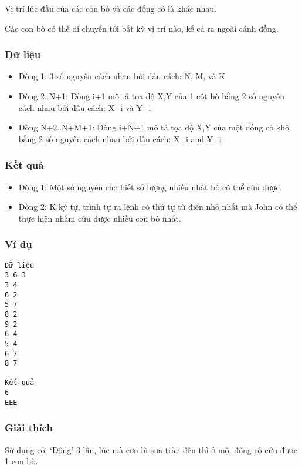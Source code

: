    Vị trí lúc đầu của các con bò và các đống cỏ là khác nhau.  

   Các con bò có thể di chuyển tới bất kỳ vị trí nào, kể cả ra ngoài cánh đồng.  

\subsubsection{   Dữ liệu  }
\begin{itemize}
	\item     Dòng 1: 3 số nguyên cách nhau bởi dấu cách: N, M, và K   
	\item     Dòng 2..N+1: Dòng i+1 mô tả tọa độ X,Y của 1 cột bò         bằng 2 số nguyên cách nhau bởi dấu cách: X\_i và Y\_i   
	\item     Dòng N+2..N+M+1: Dòng i+N+1 mô tả tọa độ X,Y của một         đống cỏ khô bằng 2 số nguyên cách nhau bởi dấu cách: X\_i and Y\_i   
\end{itemize}

\subsubsection{   Kết quả  }
\begin{itemize}
	\item     Dòng 1: Một số nguyên cho biết số lượng nhiều nhất bò có thể cứu được.   
	\item     Dòng 2: K ký tự, trình tự ra lệnh có thứ tự từ điển nhỏ nhất mà John có thể thực hiện nhằm cứu được nhiều con bò nhất.   
\end{itemize}

\subsubsection{   Ví dụ  }
\begin{verbatim}
Dữ liệu
3 6 3
3 4
6 2
5 7
8 2
9 2
6 4
5 4
6 7
8 7

Kết quả
6
EEE
\end{verbatim}

\subsubsection{   Giải thích  }

   Sử dụng còi ‘Đông’ 3 lần, lúc mà cơn lũ sữa tràn đến  thì ở mỗi đống cỏ cứu được 1 con bò.  
